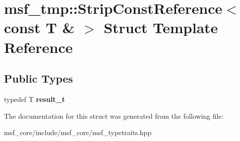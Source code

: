 \hypertarget{structmsf__tmp_1_1StripConstReference_3_01const_01T_01_6_01_4}{\section{msf\-\_\-tmp\-:\-:Strip\-Const\-Reference$<$ const T \& $>$ Struct Template Reference}
\label{structmsf__tmp_1_1StripConstReference_3_01const_01T_01_6_01_4}
}
\subsection*{Public Types}
\begin{DoxyCompactItemize}
\item 
\hypertarget{structmsf__tmp_1_1StripConstReference_3_01const_01T_01_6_01_4_a2535057bb12b6b644caf7a8e2b4059c6}{typedef T {\bfseries result\-\_\-t}}\label{structmsf__tmp_1_1StripConstReference_3_01const_01T_01_6_01_4_a2535057bb12b6b644caf7a8e2b4059c6}

\end{DoxyCompactItemize}


The documentation for this struct was generated from the following file\-:\begin{DoxyCompactItemize}
\item 
msf\-\_\-core/include/msf\-\_\-core/msf\-\_\-typetraits.\-hpp\end{DoxyCompactItemize}
